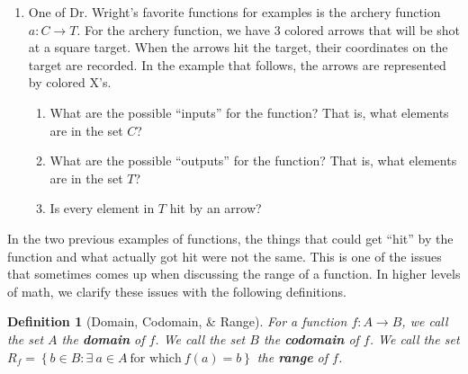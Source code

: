 \documentclass[12 pt]{article}
\newcommand{\set}[1]{\left\{#1\right\}}
\theoremstyle{definition}
\theoremstyle{plain}
\theoremstyle{mytheorem}
\theoremstyle{myexample}
\theoremstyle{mydefinition}
\newtheorem*{definition*}{Definition}
\begin{document}
\begin{enumerate}
\vspace{1in}

\item One of Dr. Wright's favorite functions for examples is the archery function $a: C \to T$.  For the archery function, we have 3 colored arrows that will be shot at a square target.  When the arrows hit the target, their coordinates on the target are recorded.  In the example that follows, the arrows are represented by colored X's.
	\begin{center}
	\end{center}
	\begin{enumerate}
	\item What are the possible ``inputs'' for the function?  That is, what elements are in the set $C$? 
	
	\vspace{1in}
	
	\item What are the possible ``outputs'' for the function?  That is, what elements are in the set $T$?
	
	\vspace{1in}
	
	\item Is every element in $T$ hit by an arrow?
	
	\vspace{1in}
	\end{enumerate}
\end{enumerate}
In the two previous examples of functions, the things that could get ``hit'' by the function and what actually got hit were not the same.  This is one of the issues that sometimes comes up when discussing the range of a function.  In higher levels of math, we clarify these issues with the following definitions.  
\begin{definition*}[Domain, Codomain, \& Range]  For a function $f: A \to B$, we call the set $A$ the \textbf{domain} of $f$.  We call the set $B$ the \textbf{codomain} of $f$.  We call the set \\
$R_f= \set{b \in B : \exists \ a \in A \ \text{for which} \ f(a)=b}$ the \textbf{range} of $f$.
\end{definition*}
\end{document}
